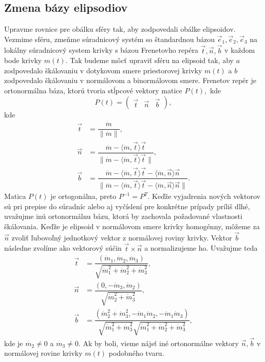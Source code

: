 \subsection{Zmena bázy elipsodiov}
Upravme rovnice pre obálku sféry tak, aby zodpovedali obálke elipsoidov. Vezmime sféru, zmeňme súradnicový systém so štandardnou bázou  $\vec{e}_1, \vec{e}_2, \vec{e}_3$ na lokálny súradnicový system krivky s bázou Frenetovho repéra $\vec{t}, \vec{n}, \vec{b}$ v každom bode krivky $m(t).$ Tak budeme môcť upraviť sféru na elipsoid tak, aby $a$ zodpovedalo škálovaniu v dotykovom smere priestorovej krivky $m(t)$ a $b$ zodpovedalo škálovaniu v normálovom a binormálovom smere. Frenetov repér je ortonormálna báza, ktorú tvoria stĺpcové vektory matice $P(t),$ kde
$$
P(t) = \left( \begin{matrix} \vec{t} & \vec{n} & \vec{b} \end{matrix} \right),
$$
kde
\begin{align*}
\vec{t} &= \dfrac{\dot{m}}{\| \dot{m} \|}, \\
\vec{n} &= \dfrac{\ddot{m} - \langle \ddot{m}, \vec{t} \rangle \vec{t}}{\| \ddot{m} - \langle \ddot{m}, \vec{t} \rangle \vec{t}\| }, \\
\vec{b} &= \dfrac{\dddot{m} - \langle \dddot{m}, \vec{t} \rangle \vec{t} - \langle \dddot{m}, \vec{n} \rangle \vec{n}}{\| \dddot{m} - \langle \dddot{m}, \vec{t} \rangle \vec{t} - \langle \dddot{m}, \vec{n} \rangle \vec{n} \| }.
\end{align*}
Matica $P(t)$ je ortogonálna, preto $P^{-1} = P^T.$
Keďže vyjadrenia nových vektorov sú pri prepise do súradníc alebo aj vyčíslení pre konkrétne prípady príliš dlhé, uvažujme inú ortonormálnu bázu, ktorá by zachovala požadované vlastnosti škálovania. Keďže je elipsoid v normálovom smere krivky homogénny, môžeme za $\vec{n}$ zvoliť ľubovoľný jednotkový vektor z normálovej roviny krivky. Vektor $\vec{b}$ následne zvolíme ako vektorový súčin $\vec{t} \times \vec{n}$ a normalizujeme ho. Uvažujme teda
\begin{align*}
\vec{t} &= \dfrac{(\dot{m}_1, \dot{m}_2, \dot{m}_3)}{\sqrt{\dot{m}_1^2 + \dot{m}_2^2 + \dot{m}_3^2}}, \\
\vec{n} &= \dfrac{(0, -\dot{m}_3, \dot{m}_2)}{\sqrt{\dot{m}_2^2 + \dot{m}_3^2}}, \\
\vec{b} &= \dfrac{(\dot{m}_2^2 + \dot{m}_3^2, -\dot{m}_1 \dot{m}_2, -\dot{m}_1 \dot{m}_3)}{\sqrt{\dot{m}_1^2 + \dot{m}_3^2}\sqrt{\dot{m}_1^2 + \dot{m}_2^2 + \dot{m}_3^2}},
\end{align*}
kde je $\dot{m_2} \neq 0$ a $\dot{m_3} \neq 0$. Ak by boli, vieme nájsť iné ortonormálne vektory $\vec{n}, \vec{b}$ v normálovej rovine krivky $m(t)$ podobného tvaru. 

